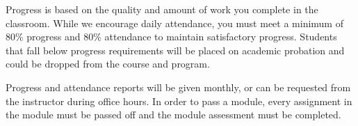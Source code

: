 Progress is based on the quality and amount of work you complete in the classroom. While we
encourage daily attendance, you must meet a minimum of 80\% progress and 80\% attendance to
maintain satisfactory progress. Students that fall below progress requirements will be placed on
academic probation and could be dropped from the course and program.
\par
\bigskip
Progress and attendance reports will be given monthly, or can be requested from the instructor during
office hours. In order to pass a module, every assignment in the module must be passed off and the
module assessment must be completed.
